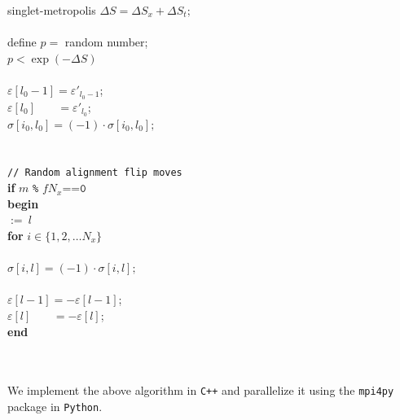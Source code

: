 \documentclass[../thesis_main.tex]{subfiles}
\begin{document}
\begin{algorithm}{singlet-metropolis}
    \>\>\> $\Delta S = \Delta S_x + \Delta S_t ;$ \\ 
    \\
    \>\>\> define $p = $ random number; \\
    \>\> $p < \exp(-\Delta S)$\\  
    \>\>\\
    \>\>\>\> $\varepsilon[l_0 - 1] = \varepsilon'_{l_0-1}$; \\
    \>\>\>\> $\varepsilon[l_0] \:\:\:\:\quad =  \varepsilon'_{l_0}$; \\
    \>\>\>\> $\sigma[i_0, l_0] = (-1)\cdot \sigma[i_0, l_0];$\\
    \>\>\\
    \\
    \>\>\> \texttt{// Random alignment flip moves} \\
    \>\>\> {\bf if} $m$ \texttt{\%} $f N_x \texttt{==0}$  \\
    \>\>\> {\bf begin} \\
    \>\>\>\>  $:= \: l$ \\
    \>\>\>\> {\bf for } $i \in \{1, 2, \ldots N_x\}$ \\
    \>\>\> \\
    \>\>\>\>\> $\sigma[i, l] = (-1)\cdot \sigma[i, l];$\\
    \>\>\>\\    
    \>\>\>\> $\varepsilon[l - 1] = - \varepsilon[l - 1]$; \\
    \>\>\>\> $\varepsilon[l] \:\:\:\:\quad =  - \varepsilon[l]$; \\
    \>\>\> {\bf end}\\

    \>\\
     \\
\end{algorithm}
We implement the above algorithm in \texttt{C++} and parallelize it using the \texttt{mpi4py} package in \texttt{Python}. 
\end{document}
